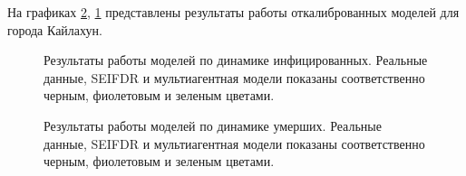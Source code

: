 На графиках \ref{FinishedModelDead}, \ref{FinishedModelInfected}  представлены результаты работы откалиброванных моделей для города Кайлахун. 

\begin{figure}[H]
	\caption{Результаты работы моделей по динамике инфицированных. Реальные данные, SEIFDR и мультиагентная модели показаны соответственно черным, фиолетовым и зеленым цветами.} 
	\label{FinishedModelInfected}
\end{figure}
\begin{figure}[H]
	\caption{Результаты работы моделей по динамике умерших. Реальные данные, SEIFDR и мультиагентная модели показаны соответственно черным, фиолетовым и зеленым цветами.}
	\label{FinishedModelDead}
\end{figure}


